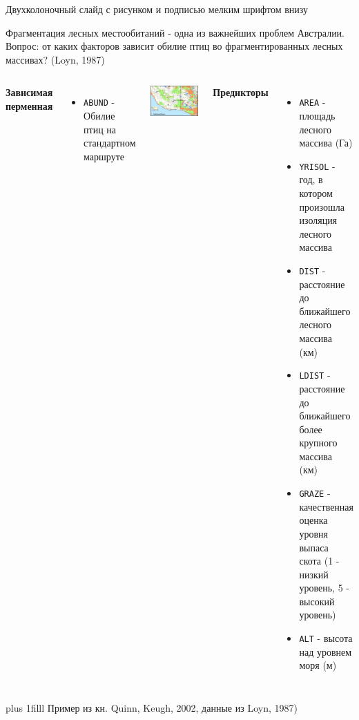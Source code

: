 \documentclass[ignorenonframetext,]{beamer}
\providecommand{\tightlist}{%
\setlength{\itemsep}{0pt}\setlength{\parskip}{0pt}}
\newcommand{\columnsbegin}{\begin{columns}}
\newcommand{\columnsend}{\end{columns}}
\begin{document}
\begin{frame}[fragile]{Двухколоночный слайд с рисунком и подписью мелким
шрифтом внизу}

Фрагментация лесных местообитаний - одна из важнейших проблем Австралии.
Вопрос: от каких факторов зависит обилие птиц во фрагментированных
лесных массивах? (Loyn, 1987)

\columnsbegin


\textbf{Зависимая перменная}

\begin{itemize}
\tightlist
\item
  \texttt{ABUND} - Обилие птиц на стандартном маршруте
\end{itemize}

\includegraphics[width=\linewidth]{images/Australia.png}


\textbf{Предикторы}

\begin{itemize}
\tightlist
\item
  \texttt{AREA} - площадь лесного массива (Га)\\
\item
  \texttt{YRISOL} - год, в котором произошла изоляция лесного массива\\
\item
  \texttt{DIST} - расстояние до ближайшего лесного массива (км)\\
\item
  \texttt{LDIST} - расстояние до ближайшего более крупного массива
  (км)\\
\item
  \texttt{GRAZE} - качественная оценка уровня выпаса скота (1 - низкий
  уровень, 5 - высокий уровень)\\
\item
  \texttt{ALT} - высота над уровнем моря (м)
\end{itemize}

\columnsend

\vskip0pt plus 1filll
\tiny{Пример из кн. Quinn, Keugh, 2002, данные из Loyn, 1987)}

\end{frame}
\end{document}
